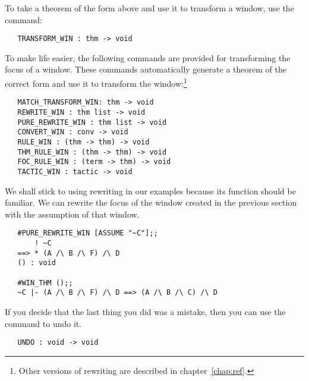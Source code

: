 To take a theorem of the form above and use it to transform a window,
use the command:
\begin{boxed}\begin{verbatim}
   TRANSFORM_WIN : thm -> void
\end{verbatim}\end{boxed}
To make life easier,
the following commands are provided for transforming the focus of a
window.
These commands automatically generate a theorem of the correct form and
use it to transform the window:\footnote{Other versions of rewriting
are described in chapter~\ref{chap:ref}.}
\begin{boxed}\begin{verbatim}
   MATCH_TRANSFORM_WIN: thm -> void
   REWRITE_WIN : thm list -> void
   PURE_REWRITE_WIN : thm list -> void
   CONVERT_WIN : conv -> void
   RULE_WIN : (thm -> thm) -> void
   THM_RULE_WIN : (thm -> thm) -> void
   FOC_RULE_WIN : (term -> thm) -> void
   TACTIC_WIN : tactic -> void
\end{verbatim}\end{boxed}
We shall stick to using rewriting in our examples because its function should
be familiar.
We can rewrite the focus of the window created in the
previous section with the assumption of that window.
\begin{session}\begin{verbatim}
   #PURE_REWRITE_WIN [ASSUME "~C"];;
       ! ~C
   ==> * (A /\ B /\ F) /\ D
   () : void

   #WIN_THM ();;
   ~C |- (A /\ B /\ F) /\ D ==> (A /\ B /\ C) /\ D
\end{verbatim}\end{session}

If you decide that the last thing you did was a mistake,
then you can use the  command to undo it.
\begin{boxed}\begin{verbatim}
   UNDO : void -> void
\end{verbatim}\end{boxed}

